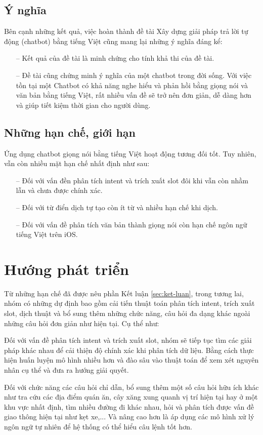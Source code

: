 \subsection{Ý nghĩa}
Bên cạnh những kết quả, việc hoàn thành đề tài Xây dựng giải pháp trả lời tự động (chatbot) bằng tiếng Việt cũng mang lại những ý nghĩa đáng kể:

\begin{itemize}
    \item[--] Kết quả của đề tài là minh chứng cho tính khả thi của đề tài.
    \item[--] Đề tài cũng chứng minh ý nghĩa của một chatbot trong đời sống. Với việc tồn tại một Chatbot có khả năng nghe hiểu và phản hồi bằng giọng nói và văn bản bằng tiếng Việt, rất nhiều vấn đề sẽ trở nên đơn giản, dễ dàng hơn và giúp tiết kiệm thời gian cho người dùng.
\end{itemize}

\subsection{Những hạn chế, giới hạn}
Ứng dụng chatbot giọng nói bằng tiếng Việt hoạt động tương đối tốt. Tuy nhiên, vẫn còn nhiều mặt hạn chế nhất định như sau:
\begin{itemize}
    \item[--] Đối với vấn đền phân tích intent và trích xuất slot đôi khi vẫn còn nhầm lẫn và chưa được chính xác.
    \item[--] Đối với từ điển dịch tự tạo còn ít từ và nhiều hạn chế khi dịch.
    \item[--] Đối với vấn đề phân tích văn bản thành giọng nói còn hạn chế ngôn ngữ tiếng Việt trên iOS.
\end{itemize}

\section{Hướng phát triển}


Từ những hạn chế đã được nêu phần Kết luận \ref{sec:ket-luan}, trong tương lai, nhóm có những dự định bao gồm cải tiến thuật toán phân tích intent, trích xuất slot, dịch thuật và bổ sung thêm những chức năng, câu hỏi đa dạng khác ngoài những câu hỏi đơn giản như hiện tại. Cụ thể như:

Đối với vấn đề phân tích intent và trích xuất slot, nhóm sẽ tiếp tục tìm các giải pháp khác nhau để cải thiện độ chính xác khi phân tích dữ liệu. Bằng cách thực hiện huấn luyện mô hình nhiều hơn và đào sâu vào thuật toán để xem xét nguyên nhân cụ thể và đưa ra hướng giải quyết.

Đối với chức năng các câu hỏi chỉ dẫn, bổ sung thêm một số câu hỏi hữu ích khác như tra cứu các địa điểm quán ăn, cây xăng xung quanh vị trí hiện tại hay ở một khu vực nhất định, tìm nhiều đường đi khác nhau, hỏi và phân tích được vấn đề giao thông hiện tại như kẹt xe,... Và nâng cao hơn là áp dụng các mô hình xử lý ngôn ngữ tự nhiên để hệ thống có thể hiểu câu lệnh tốt hơn.